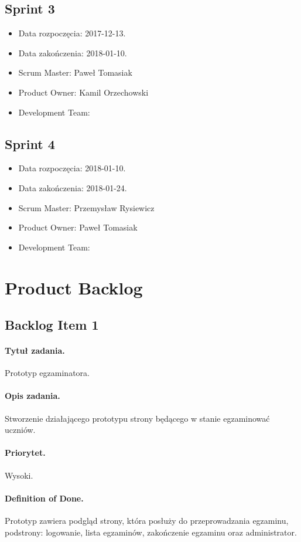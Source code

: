 \documentclass[a4paper]{article}
\begin{document}
\subsection{Sprint 3}

\begin{itemize}
\item Data rozpoczęcia: 2017-12-13.
\item  Data zakończenia: 2018-01-10.
\item Scrum Master: Paweł Tomasiak
\item Product Owner: Kamil Orzechowski
\item Development Team:
\end{itemize}

\subsection{Sprint 4}

\begin{itemize}
\item Data rozpoczęcia: 2018-01-10.
\item  Data zakończenia: 2018-01-24.
\item Scrum Master: Przemysław Rysiewicz
\item Product Owner: Paweł Tomasiak
\item Development Team:
\end{itemize}


\section{Product Backlog}

\subsection{Backlog Item 1}
\paragraph{Tytuł zadania.} Prototyp egzaminatora.
\paragraph{Opis zadania.} Stworzenie działającego prototypu strony będącego w stanie egzaminować uczniów.
\paragraph{Priorytet.} Wysoki.
\paragraph{Definition of Done.} Prototyp zawiera podgląd strony, która posłuży do przeprowadzania egzaminu, podstrony: logowanie, lista egzaminów, zakończenie egzaminu oraz administrator.
\end{document}
